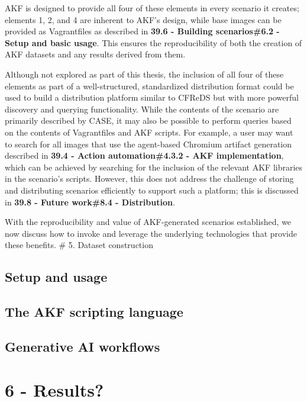 AKF is designed to provide all four of these elements in every scenario
it creates; elements 1, 2, and 4 are inherent to AKF's design, while
base images can be provided as Vagrantfiles as described in \textbf{39.6
- Building scenarios\#6.2 - Setup and basic usage}. This ensures the
reproducibility of both the creation of AKF datasets and any results
derived from them.

Although not explored as part of this thesis, the inclusion of all four
of these elements as part of a well-structured, standardized
distribution format could be used to build a distribution platform
similar to CFReDS but with more powerful discovery and querying
functionality. While the contents of the scenario are primarily
described by CASE, it may also be possible to perform queries based on
the contents of Vagrantfiles and AKF scripts. For example, a user may
want to search for all images that use the agent-based Chromium artifact
generation described in \textbf{39.4 - Action automation\#4.3.2 - AKF
implementation}, which can be achieved by searching for the inclusion of
the relevant AKF libraries in the scenario's scripts. However, this does
not address the challenge of storing and distributing scenarios
efficiently to support such a platform; this is discussed in
\textbf{39.8 - Future work\#8.4 - Distribution}.

With the reproducibility and value of AKF-generated scenarios
established, we now discuss how to invoke and leverage the underlying
technologies that provide these benefits. \# 5. Dataset construction

\subsection{Setup and usage}\label{setup-and-usage}

\subsection{The AKF scripting
language}\label{the-akf-scripting-language}

\subsection{Generative AI
workflows}\label{generative-ai-workflows}

\section{6 - Results?}\label{results}


